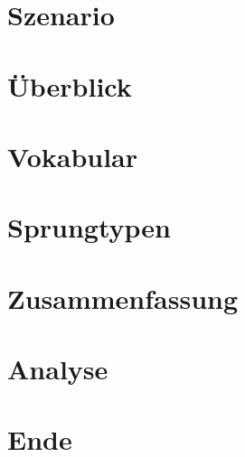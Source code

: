 \documentclass[hyperref={pdfpagelabels=false},usepdftitle=false]{beamer}
\begin{document}
\title{\titleText}
\subtitle{}
\author{\tutor}
\date{28. Februar 2014}
\subject{Proseminar Informatik}

\frame{\titlepage}


\section{Szenario}


\section{Überblick}


\section{Vokabular}


\section{Sprungtypen}


\section{Zusammenfassung}


\section{Analyse}


\section{Ende}

\end{document}
